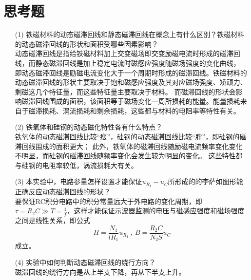 \documentclass{article}
\begin{document}
    \section{思考题}
    \begin{enumerate}
        \item [(1)] 铁磁材料的动态磁滞回线和静态磁滞回线在概念上有什么区别？铁磁材料的动态磁滞回线的形状和面积受哪些因素影响？\\
        动态磁滞回线是指给铁磁材料加上交变磁场即交变励磁电流时形成的磁滞回线，而静态磁滞回线是加上稳定电流时磁感应强度随磁场强度的变化曲线，
        即动态磁滞回线是励磁电流变化大于一个周期时形成的磁滞回线。铁磁材料的动态磁滞回线的形状主要取决于饱和磁感应强度及其对应磁场强度、矫顽力、剩磁这几个特征量，而这些特征量主要取决于材料。
        而磁滞回线的形状会影响磁滞回线围成的面积，该面积等于磁场变化一周所损耗的能量。能量损耗来自于磁滞损耗、涡流损耗和剩余损耗，这些都与材料的电阻率等特性有关。

        \item [(2)] 铁氧体和硅钢的动态磁化特性各有什么特点？\\
        铁氧体的动态磁滞回线比较“瘦”，硅钢的动态磁滞回线比较“胖”，即硅钢的磁滞回线围成的面积更大；
        此外，铁氧体的磁滞回线随励磁电流频率变化变化不明显，而硅钢的磁滞回线随频率变化会发生较为明显的变化。
        这些特性都与硅钢的电阻率较低，涡流损耗大有关。
        
        \item [(3)] 本实验中，电路参量怎样设置才能保证$u_{R_1}-u_C$所形成的的李萨如图形能正确反应动态磁滞回线的形状？\\
        要保证RC积分电路中的积分常量远大于外电路的变化周期，即$\tau=R_2C\gg T=\frac{1}{f}$，这样才能保证示波器监测的电压与磁感应强度和磁场强度之间是线性关系，即公式
        $$H=\frac{N_{1}}{l R_{1}} u_{R_{1}}\ ,\ B=\frac{R_{2} C}{N_{2} S} u_{C}$$
        成立。

        \item [(4)] 实验中如何判断动态磁滞回线的绕行方向？\\
        磁滞回线的绕行方向是从上半支下降，再从下半支上升。
    \end{enumerate}
\end{document}
